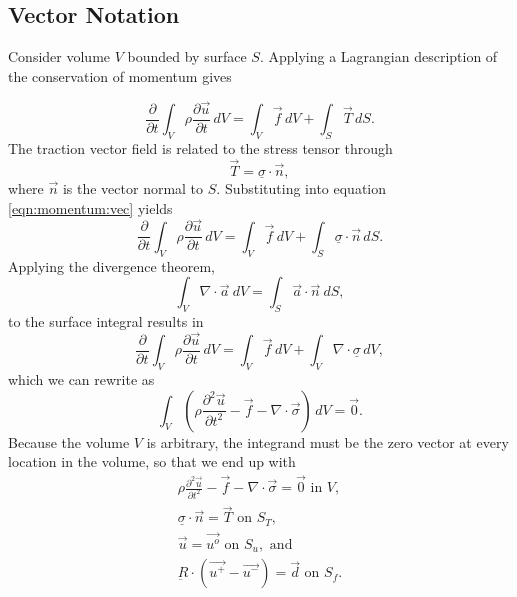 \subsection{Vector Notation}

Consider volume $V$ bounded by surface $S$. Applying a Lagrangian
description of the conservation of momentum gives

\begin{equation}
\frac{\partial}{\partial t}\int_{V}\rho\frac{\partial\vec{u}}{\partial t}\, dV=\int_{V}\overrightarrow{f}\, dV+\int_{S}\overrightarrow{T}\, dS.\label{eqn:momentum:vec}
\end{equation}
The traction vector field is related to the stress tensor through
\begin{equation}
\overrightarrow{T}=\underline{\sigma}\cdot\overrightarrow{n},
\end{equation}
where $\overrightarrow{n}$ is the vector normal to $S$. Substituting
into equation \vref{eqn:momentum:vec} yields
\begin{equation}
\frac{\partial}{\partial t}\int_{V}\rho\frac{\partial\overrightarrow{u}}{\partial t}\, dV=\int_{V}\overrightarrow{f}\, dV+\int_{S}\underline{\sigma}\cdot\overrightarrow{n}\, dS.
\end{equation}
Applying the divergence theorem,
\begin{equation}
\int_{V}\nabla\cdot\overrightarrow{a}\: dV=\int_{S}\overrightarrow{a}\cdot\overrightarrow{n}\: dS,
\end{equation}
to the surface integral results in
\begin{equation}
\frac{\partial}{\partial t}\int_{V}\rho\frac{\partial\overrightarrow{u}}{\partial t}\, dV=\int_{V}\overrightarrow{f}\, dV+\int_{V}\nabla\cdot\underline{\sigma}\, dV,
\end{equation}
which we can rewrite as
\begin{equation}
\int_{V}\left(\rho\frac{\partial^{2}\overrightarrow{u}}{\partial t^{2}}-\overrightarrow{f}-\nabla\cdot\overrightarrow{\sigma}\right)\, dV=\vec{0}.
\end{equation}
Because the volume $V$ is arbitrary, the integrand must be the zero
vector at every location in the volume, so that we end up with
\begin{gather}
\rho\frac{\partial^{2}\overrightarrow{u}}{\partial t^{2}}-\overrightarrow{f}-\nabla\cdot\overrightarrow{\sigma}=\vec{0}\text{ in }V,\\
\underline{\sigma}\cdot\overrightarrow{n}=\overrightarrow{T}\text{ on }S_{T}\text{,}\\
\overrightarrow{u}=\overrightarrow{u^{o}}\text{ on }S_{u},\text{ and}\\
\underbar{R}\cdot(\vec{u^{+}}-\vec{u^{-}})=\vec{d}\text{ on }S_{f}.
\end{gather}
